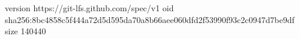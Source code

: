 version https://git-lfs.github.com/spec/v1
oid sha256:8bc4858c5f444a72d5d595da70a8b66aee060dfd2f53990f93c2c0947d7be9df
size 140440
